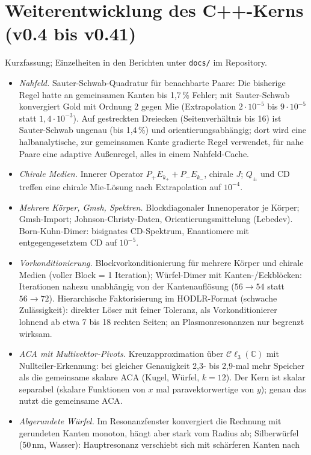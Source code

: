 \documentclass[11pt, a4paper]{article}
\newcommand{\clc}{\mathcal{C}\ell_{3}(\mathbb{C})}
\begin{document}
\section{Weiterentwicklung des C++-Kerns (v0.4 bis v0.41)}\label{sec:cpp2}
Kurzfassung; Einzelheiten in den Berichten unter \texttt{docs/} im Repository.
\begin{itemize}[leftmargin=*]
  \item \emph{Nahfeld.} Sauter-Schwab-Quadratur für benachbarte Paare: Die bisherige Regel hatte an gemeinsamen
    Kanten bis 1,7\,\% Fehler; mit Sauter-Schwab konvergiert Gold mit Ordnung 2 gegen Mie (Extrapolation
    $2\cdot10^{-5}$ bis $9\cdot10^{-5}$ statt $1{,}4\cdot10^{-3}$). Auf gestreckten Dreiecken (Seitenverhältnis bis 16)
    ist Sauter-Schwab ungenau (bis 1,4\,\%) und orientierungsabhängig; dort wird eine halbanalytische, zur
    gemeinsamen Kante gradierte Regel verwendet, für nahe Paare eine adaptive Außenregel, alles in einem Nahfeld-Cache.
  \item \emph{Chirale Medien.} Innerer Operator $P_+E_{k_+}+P_-E_{k_-}$, chirale $J$; $Q_\pm$ und CD treffen eine
    chirale Mie-Lösung nach Extrapolation auf $10^{-4}$.
  \item \emph{Mehrere Körper, Gmsh, Spektren.} Blockdiagonaler Innenoperator je Körper; Gmsh-Import;
    Johnson-Christy-Daten, Orientierungsmittelung (Lebedev). Born-Kuhn-Dimer: bisignates CD-Spektrum,
    Enantiomere mit entgegengesetztem CD auf $10^{-5}$.
  \item \emph{Vorkonditionierung.} Blockvorkonditionierung für mehrere Körper und chirale Medien (voller Block =
    1 Iteration); Würfel-Dimer mit Kanten-/Eckblöcken: Iterationen nahezu unabhängig von der Kantenauflösung
    ($56\to54$ statt $56\to72$). Hierarchische Faktorisierung im HODLR-Format (schwache Zulässigkeit): direkter
    Löser mit feiner Toleranz, als Vorkonditionierer lohnend ab etwa 7 bis 18 rechten Seiten; an Plasmonresonanzen
    nur begrenzt wirksam.
  \item \emph{ACA mit Multivektor-Pivots.} Kreuzapproximation über $\clc$ mit Nullteiler-Erkennung: bei gleicher
    Genauigkeit 2,3- bis 2,9-mal mehr Speicher als die gemeinsame skalare ACA (Kugel, Würfel, $k=12$). Der Kern ist
    skalar separabel (skalare Funktionen von $x$ mal paravektorwertige von $y$); genau das nutzt die gemeinsame ACA.
  \item \emph{Abgerundete Würfel.} Im Resonanzfenster konvergiert die Rechnung mit gerundeten Kanten monoton, hängt
    aber stark vom Radius ab; Silberwürfel (50\,nm, Wasser): Hauptresonanz verschiebt sich mit schärferen Kanten nach

\end{itemize}
\end{document}
